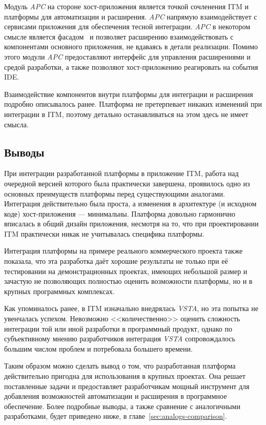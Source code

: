 Модуль {\it APC} на стороне хост-приложения является точкой сочленения ITM и платформы для автоматизации и расширения. {\it APC} напрямую взаимодействует с сервисами приложения для обеспечения тесной интеграции. {\it APC} в некотором смысле является фасадом~\cite{band-four} и позволяет расширению взаимодействовать с компонентами основного приложения, не вдаваясь в детали реализации. Помимо этого модули {\it APC} предоставляют интерфейс для управления расширениями и средой разработки, а также позволяют хост-приложению реагировать на события IDE.

Взаимодействие компонентов внутри платформы для интеграции и расширения подробно описывалось ранее. Платформа не претерпевает никаких изменений при интеграции в ITM, поэтому детально останавливаться на этом здесь не имеет смысла.

\subsection{Выводы}

При интеграции разработанной платформы в приложение ITM, работа над очередной версией которого была практически завершена, проявилось одно из основных преимуществ платформы перед существующими аналогами. Интеграция действительно была проста, а изменения в архитектуре (и исходном коде) хост-приложения --- минимальны. Платформа довольно гармонично вписалась в общий дизайн приложения, несмотря на то, что при проектировании ITM практически никак не учитывалась специфика платформы. 

Интеграция платформы на примере реального коммерческого проекта также показала, что эта разработка даёт хорошие результаты не только при её тестировании на демонстрационных проектах, имеющих небольшой размер и зачастую не позволяющих полностью оценить возможности платформы, но и в крупных программных комплексах.

Как упоминалось ранее, в ITM изначально внедрялась {\it VSTA}, но эта попытка не увенчалась успехом. Невозможно <<количественно>> оценить сложность интеграции той или иной разработки в программный продукт, однако по субъективному мнению разработчиков интеграция {\it VSTA} сопровождалось большим числом проблем и потребовала большего времени.

Таким образом можно сделать вывод о том, что разработанная платформа действительно пригодна для использования в крупных проектах. Она решает поставленные задачи и предоставляет разработчикам мощный инструмент для добавления возможностей автоматизации и расширения в программное обеспечение. Более подробные выводы, а также сравнение с аналогичными разработками, будет приведено ниже, в главе~\ref{sec:analogs-comparison}.

\pagebreak
